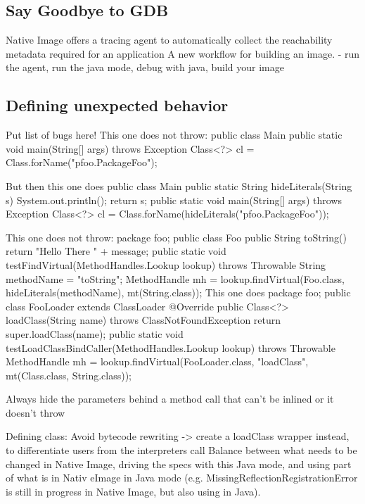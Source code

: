 \subsection{Say Goodbye to GDB}
Native Image offers a tracing agent to automatically collect the reachability metadata required for an application
A new workflow for building an image.
- run the agent, run the java mode, debug with java, build your image
\subsection{Defining unexpected behavior}
Put list of bugs here!
This one does not throw:
public class Main {
    public static void main(String[] args) throws Exception {
        Class<?> cl = Class.forName("pfoo.PackageFoo");
    }
}

But then this one does
public class Main {
    public static String hideLiterals(String s) {
        System.out.println();
        return s;
    }
    public static void main(String[] args) throws Exception {
        Class<?> cl = Class.forName(hideLiterals("pfoo.PackageFoo"));
    }
}

This one does not throw:
package foo;
public class Foo {
    public String toString() {
        return "Hello There " + message;
    }
}
public static void testFindVirtual(MethodHandles.Lookup lookup) throws Throwable {
    String methodName = "toString";
    MethodHandle mh = lookup.findVirtual(Foo.class, hideLiterals(methodName), mt(String.class));
}
This one does
package foo;
public class FooLoader extends ClassLoader {
    @Override
    public Class<?> loadClass(String name) throws ClassNotFoundException {
        return super.loadClass(name);
    }
}
public static void testLoadClassBindCaller(MethodHandles.Lookup lookup) throws Throwable {
    MethodHandle mh = lookup.findVirtual(FooLoader.class, "loadClass", mt(Class.class, String.class));
}

Always hide the parameters behind a method call that can't be inlined or it doesn't throw


Defining class: Avoid bytecode rewriting -> create a loadClass wrapper instead, to differentiate users from the interpreters call
Balance between what needs to be changed in Native Image, driving the specs with this Java mode, and using part of what is in Nativ eImage in Java mode (e.g. 
MissingReflectionRegistrationError is still in progress in Native Image, but also using in Java).

